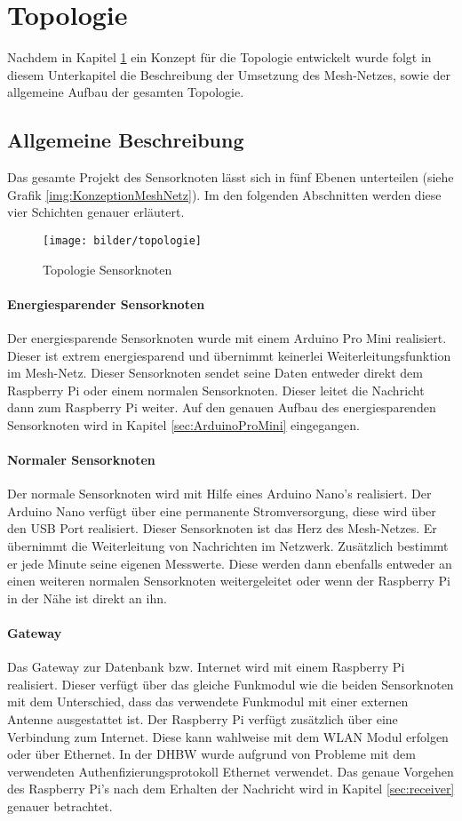 \section{Topologie}
\label{sec:RealisierungTopologie}
Nachdem in Kapitel \ref{sec:KonzeptionMeshNetz} ein Konzept für die Topologie entwickelt wurde folgt in diesem Unterkapitel die Beschreibung der Umsetzung des Mesh-Netzes, sowie der allgemeine Aufbau der gesamten Topologie. 
\subsection{Allgemeine Beschreibung}
Das gesamte Projekt des Sensorknoten lässt sich in fünf Ebenen unterteilen (siehe Grafik \ref{img:KonzeptionMeshNetz}). Im den folgenden Abschnitten werden diese vier Schichten genauer erläutert.
\begin{figure}
	\centering
	\texttt{[image: bilder/topologie]}
	\caption{Topologie Sensorknoten}
	\label{sec:KonzeptionMeshNetz}
\end{figure}
\paragraph{Energiesparender Sensorknoten} Der energiesparende Sensorknoten wurde mit einem Arduino Pro Mini realisiert. Dieser ist extrem energiesparend und übernimmt keinerlei Weiterleitungsfunktion im Mesh-Netz. Dieser Sensorknoten sendet seine Daten entweder direkt dem Raspberry Pi oder einem normalen Sensorknoten. Dieser leitet die  Nachricht dann zum Raspberry Pi weiter. Auf den genauen Aufbau des energiesparenden Sensorknoten wird in Kapitel \ref{sec:ArduinoProMini} eingegangen.
\paragraph{Normaler Sensorknoten} Der normale Sensorknoten wird mit Hilfe eines Arduino Nano’s realisiert. Der Arduino Nano verfügt über eine permanente Stromversorgung, diese wird über den USB Port realisiert. Dieser Sensorknoten ist das Herz des Mesh-Netzes. Er übernimmt die Weiterleitung von Nachrichten im Netzwerk. Zusätzlich bestimmt er jede Minute seine eigenen Messwerte. Diese werden dann ebenfalls entweder an einen weiteren normalen Sensorknoten weitergeleitet oder wenn der Raspberry Pi in der Nähe ist direkt an ihn. 
\paragraph{Gateway} Das Gateway zur Datenbank bzw. Internet wird mit einem Raspberry Pi realisiert. Dieser verfügt über das gleiche Funkmodul wie die beiden Sensorknoten mit dem Unterschied, dass das verwendete Funkmodul mit einer externen Antenne ausgestattet ist. Der Raspberry Pi verfügt zusätzlich über eine Verbindung zum Internet. Diese kann wahlweise mit dem WLAN Modul erfolgen oder über Ethernet. In der DHBW wurde aufgrund von Probleme mit dem verwendeten Authenfizierungsprotokoll  Ethernet verwendet. Das genaue Vorgehen des Raspberry Pi’s nach dem Erhalten der Nachricht wird in Kapitel \ref{sec:receiver} genauer betrachtet.
